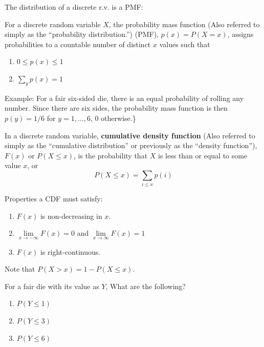 \documentclass[
]{book}
\begin{document}
The distribution of a discrete r.v. is a PMF:

\begin{definition}
\protect\hypertarget{def:unnamed-chunk-76}{}\label{def:unnamed-chunk-76}

For a discrete random variable \(X\), the probability mass function (Also referred to simply as the ``probability distribution.'') (PMF), \(p(x)=P(X=x)\), assigns probabilities to a countable number of distinct \(x\) values such that

\begin{enumerate}
\def\labelenumi{\arabic{enumi}.}
\tightlist
\item
  \(0\le p(x)\le 1\)
\item
  \(\sum\limits_y p(x)=1\)
\end{enumerate}

\end{definition}

Example: For a fair six-sided die, there is an equal probability of rolling any number. Since there are six sides, the probability mass function is then \(p(y)=1/6\) for \(y=1,\ldots,6\), 0 otherwise.\}

In a discrete random variable, \textbf{cumulative density function} (Also referred to simply as the ``cumulative distribution'' or previously as the ``density function''), \(F(x)\) or \(P(X\le x)\), is the probability that \(X\) is less than or equal to some value \(x\), or \[P(X\le x)=\sum\limits_{i\le x} p(i)\]

Properties a CDF must satisfy:

\begin{enumerate}
\def\labelenumi{\arabic{enumi}.}
\tightlist
\item
  \(F(x)\) is non-decreasing in \(x\).
\item
  \(\lim\limits_{x \to -\infty} F(x) = 0\) and \(\lim\limits_{x \to \infty} F(x) = 1\)
\item
  \(F(x)\) is right-continuous.
\end{enumerate}

Note that \(P(X > x) = 1 - P(X \le x)\).

\begin{example}
\protect\hypertarget{exm:unnamed-chunk-77}{}\label{exm:unnamed-chunk-77}

For a fair die with its value as \(Y\), What are the following?

\begin{enumerate}
\def\labelenumi{\arabic{enumi}.}
\tightlist
\item
  \(P(Y\le 1)\)
\item
  \(P(Y\le 3)\)
\item
  \(P(Y\le 6)\)
\end{enumerate}

\end{example}
\end{document}
